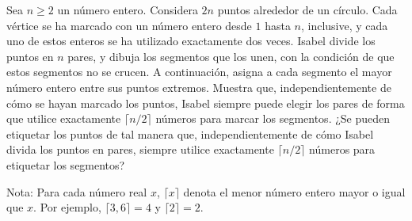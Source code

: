 Sea $n\geq 2$ un número entero. Considera $2n$ puntos alrededor de un círculo. Cada vértice se ha marcado con un número entero desde $1$ hasta $n$, inclusive, y cada uno de estos enteros se ha utilizado exactamente dos veces. Isabel divide los puntos en $n$ pares, y dibuja los segmentos que los unen, con la condición de que estos segmentos no se crucen. A continuación, asigna a cada segmento el mayor número entero entre sus puntos extremos. Muestra que, independientemente de cómo se hayan marcado los puntos, Isabel siempre puede elegir los pares de forma que utilice exactamente $\lceil n/2\rceil$ números para marcar los segmentos. ¿Se pueden etiquetar los puntos de tal manera que, independientemente de cómo Isabel divida los puntos en pares, siempre utilice exactamente $\lceil n/2\rceil$ números para etiquetar los segmentos?

Nota: Para cada número real $x$, $\lceil x\rceil$ denota el menor número entero mayor o igual que $x$. Por ejemplo, $\lceil 3,6\rceil=4$ y $\lceil 2\rceil=2$.


